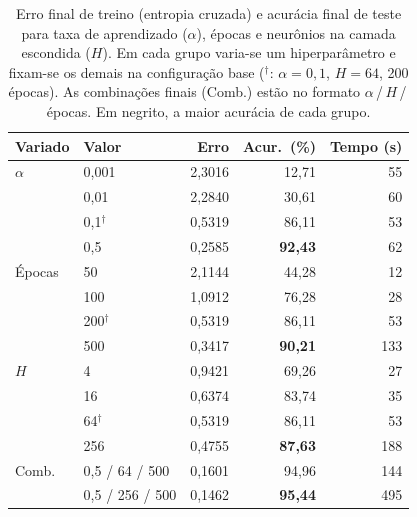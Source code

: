 \begin{table}[t]
\centering
\small
\setlength{\tabcolsep}{4pt}
\begin{tabular}{llrrr}
\toprule
Variado & Valor & Erro & Acur.\ (\%) & Tempo (s) \\
\midrule
$\alpha$ & 0{,}001 & 2{,}3016 & 12{,}71 & 55 \\
 & 0{,}01 & 2{,}2840 & 30{,}61 & 60 \\
 & 0{,}1$^\dagger$ & 0{,}5319 & 86{,}11 & 53 \\
 & 0{,}5 & 0{,}2585 & \textbf{92{,}43} & 62 \\
\addlinespace
Épocas & 50 & 2{,}1144 & 44{,}28 & 12 \\
 & 100 & 1{,}0912 & 76{,}28 & 28 \\
 & 200$^\dagger$ & 0{,}5319 & 86{,}11 & 53 \\
 & 500 & 0{,}3417 & \textbf{90{,}21} & 133 \\
\addlinespace
$H$ & 4 & 0{,}9421 & 69{,}26 & 27 \\
 & 16 & 0{,}6374 & 83{,}74 & 35 \\
 & 64$^\dagger$ & 0{,}5319 & 86{,}11 & 53 \\
 & 256 & 0{,}4755 & \textbf{87{,}63} & 188 \\
\midrule
Comb. & 0{,}5 / 64 / 500 & 0{,}1601 & 94{,}96 & 144 \\
 & 0{,}5 / 256 / 500 & 0{,}1462 & \textbf{95{,}44} & 495 \\
\bottomrule
\end{tabular}
\caption{Erro final de treino (entropia cruzada) e acurácia final de teste para taxa de aprendizado ($\alpha$), épocas e neurônios na camada escondida ($H$). Em cada grupo varia-se um hiperparâmetro e fixam-se os demais na configuração base ($^\dagger$: $\alpha=0{,}1$, $H=64$, 200 épocas). As combinações finais (Comb.) estão no formato $\alpha$\,/\,$H$\,/\,épocas. Em negrito, a maior acurácia de cada grupo.}
\label{tab:resultados}
\end{table}
